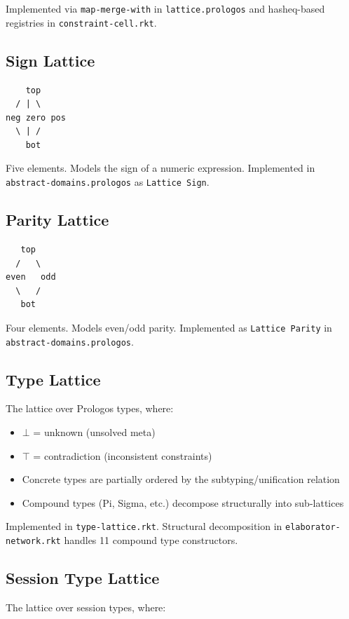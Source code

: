 \documentclass[11pt]{article}
\begin{document}
Implemented via \texttt{map-merge-with} in \texttt{lattice.prologos} and hasheq-based
registries in \texttt{constraint-cell.rkt}.
\subsection{Sign Lattice}
\label{sec:org73747f6}

\begin{verbatim}
    top
  / | \
neg zero pos
  \ | /
    bot
\end{verbatim}

Five elements. Models the sign of a numeric expression. Implemented in
\texttt{abstract-domains.prologos} as \texttt{Lattice Sign}.
\subsection{Parity Lattice}
\label{sec:orgac5deda}

\begin{verbatim}
   top
  /   \
even   odd
  \   /
   bot
\end{verbatim}

Four elements. Models even/odd parity. Implemented as \texttt{Lattice Parity} in
\texttt{abstract-domains.prologos}.
\subsection{Type Lattice}
\label{sec:org6a61c8e}

The lattice over Prologos types, where:

\begin{itemize}
\item \(\bot\) = unknown (unsolved meta)
\item \(\top\) = contradiction (inconsistent constraints)
\item Concrete types are partially ordered by the subtyping/unification relation
\item Compound types (Pi, Sigma, etc.) decompose structurally into sub-lattices
\end{itemize}

Implemented in \texttt{type-lattice.rkt}. Structural decomposition in
\texttt{elaborator-network.rkt} handles 11 compound type constructors.
\subsection{Session Type Lattice}
\label{sec:orga4deb78}

The lattice over session types, where:
\end{document}
